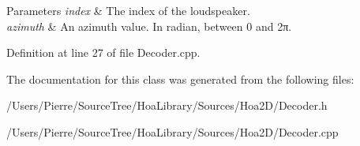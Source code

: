 \begin{DoxyParams}{Parameters}
{\em index} & The index of the loudspeaker. \\
\hline
{\em azimuth} & An azimuth value. In radian, between 0 and 2π. \\
\hline
\end{DoxyParams}


Definition at line 27 of file Decoder.\-cpp.



The documentation for this class was generated from the following files\-:\begin{DoxyCompactItemize}
\item 
/\-Users/\-Pierre/\-Source\-Tree/\-Hoa\-Library/\-Sources/\-Hoa2\-D/Decoder.\-h\item 
/\-Users/\-Pierre/\-Source\-Tree/\-Hoa\-Library/\-Sources/\-Hoa2\-D/Decoder.\-cpp\end{DoxyCompactItemize}

